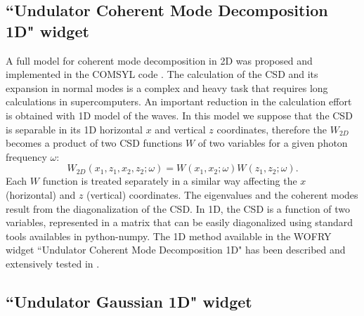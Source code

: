 \documentclass{iopconfser}
\newcommand{\todo}[1]{{\color{red}[TODO: "#1'']}}
\begin{document}
\subsection{``Undulator Coherent Mode Decomposition 1D" widget}
\label{sec:CMD}

A full model for coherent mode decomposition in 2D was proposed and implemented in the COMSYL code \citep{glass2017}. The calculation of the CSD and its expansion in normal modes is a complex and heavy task that requires long calculations in supercomputers. 
An important reduction in the calculation effort is obtained with 1D model of the waves. In this model we suppose that the CSD is separable in its 1D horizontal $x$ and vertical $z$ coordinates, therefore the $W_{2D}$ becomes a product of two CSD functions $W$ of two variables for a given photon frequency $\omega$:
\begin{equation}
W_{2D}(x_1,z_1,x_2,z_2;\omega) = W(x_1,x_2;\omega) W(z_1,z_2;\omega).
\label{eq:CSD_2D}
\end{equation}
Each $W$ function is treated separately in a similar way affecting the $x$ (horizontal) and $z$ (vertical) coordinates.
The eigenvalues and the coherent modes result from the diagonalization of the CSD.  In 1D, the CSD is a function of two variables, represented in a matrix that can be easily diagonalized using standard tools availables in python-numpy. 
The 1D method  available in the WOFRY widget ``Undulator Coherent Mode Decomposition 1D" has been described and extensively tested in \citep{SanchezdelRio2022CMD}.

\subsection{``Undulator Gaussian 1D" widget}
\label{sec:undulatorG}
\end{document}
